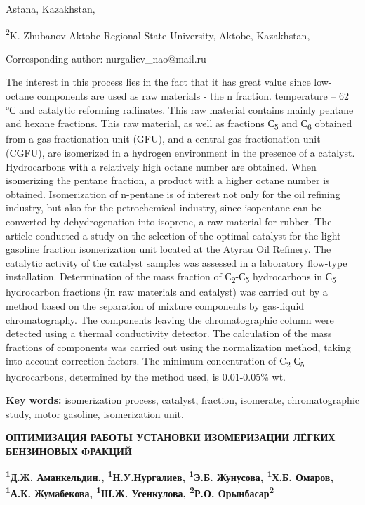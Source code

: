 Astana, Kazakhstan,

\textsuperscript{2}K. Zhubanov Aktobe Regional State University, Aktobe,
Kazakhstan,

Corresponding author: nurgaliev\_nao@mail.ru

The interest in this process lies in the fact that it has great value
since low-octane components are used as raw materials - the n fraction.
temperature -- 62 °С and catalytic reforming raffinates. This raw
material contains mainly pentane and hexane fractions. This raw
material, as well as fractions С\textsubscript{5} and С\textsubscript{6}
obtained from a gas fractionation unit (GFU), and a central gas
fractionation unit (CGFU), are isomerized in a hydrogen environment in
the presence of a catalyst. Hydrocarbons with a relatively high octane
number are obtained. When isomerizing the pentane fraction, a product
with a higher octane number is obtained. Isomerization of n-pentane is
of interest not only for the oil refining industry, but also for the
petrochemical industry, since isopentane can be converted by
dehydrogenation into isoprene, a raw material for rubber. The article
conducted a study on the selection of the optimal catalyst for the light
gasoline fraction isomerization unit located at the Atyrau Oil Refinery.
The catalytic activity of the catalyst samples was assessed in a
laboratory flow-type installation. Determination of the mass fraction of
С\textsubscript{2}-С\textsubscript{5} hydrocarbons in С\textsubscript{5}
hydrocarbon fractions (in raw materials and catalyst) was carried out by
a method based on the separation of mixture components by gas-liquid
chromatography. The components leaving the chromatographic column were
detected using a thermal conductivity detector. The calculation of the
mass fractions of components was carried out using the normalization
method, taking into account correction factors. The minimum
concentration of C\textsubscript{2}-С\textsubscript{5} hydrocarbons,
determined by the method used, is 0.01-0.05\% wt.

\textbf{Key words:} isomerization process, catalyst, fraction,
isomerate, chromatographic study, motor gasoline, isomerization unit.

\textbf{ОПТИМИЗАЦИЯ РАБОТЫ УСТАНОВКИ ИЗОМЕРИЗАЦИИ ЛЁГКИХ БЕНЗИНОВЫХ
ФРАКЦИЙ}

\textbf{\textsuperscript{1}Д.Ж. Аманкельдин.,
\textsuperscript{1}Н.У.Нургалиев, \textsuperscript{1}Э.Б. Жунусова,
\textsuperscript{1}Х.Б. Омаров,\\
\textsuperscript{1}А.К. Жумабекова, \textsuperscript{1}Ш.Ж. Усенкулова,
\textsuperscript{2}Р.О. Орынбасар\textsuperscript{2}}

